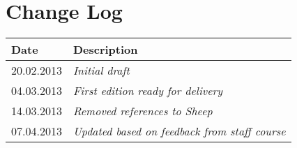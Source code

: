 \section{Change Log}
\label{sec:changelog}
\begin{tabular}{|l|l|}
\hline
Date & Description \\ \hline
20.02.2013 & \emph{Initial draft\/} \\ \hline
04.03.2013 & \emph{First edition ready for delivery\/} \\ \hline
14.03.2013 & \emph{Removed references to Sheep\/} \\ \hline
07.04.2013 & \emph{Updated based on feedback from staff course\/} \\ \hline
\end{tabular}
